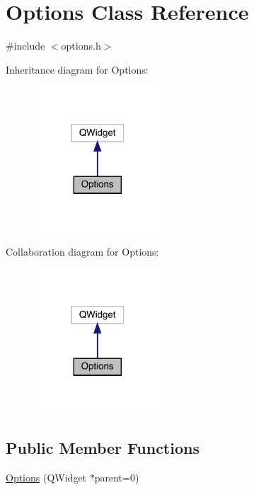 \hypertarget{class_options}{}\section{Options Class Reference}
\label{class_options}


{\ttfamily \#include $<$options.\+h$>$}



Inheritance diagram for Options\+:
\nopagebreak
\begin{figure}[H]
\begin{center}
\leavevmode
\includegraphics[width=135pt]{class_options__inherit__graph}
\end{center}
\end{figure}


Collaboration diagram for Options\+:
\nopagebreak
\begin{figure}[H]
\begin{center}
\leavevmode
\includegraphics[width=135pt]{class_options__coll__graph}
\end{center}
\end{figure}
\subsection*{Public Member Functions}
\begin{DoxyCompactItemize}
\item 
\mbox{\hyperlink{class_options_a87403ad1d6bd9ae2b54af860bb0f0952}{Options}} (Q\+Widget $\ast$parent=0)
\end{DoxyCompactItemize}


